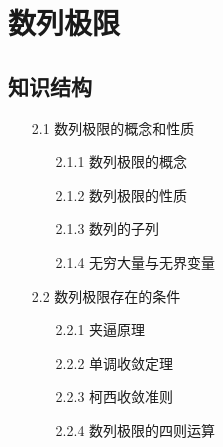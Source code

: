 \documentclass[12pt,UTF8]{ctexart}
\begin{document}
\setcounter{section}{1}
\section{数列极限}
\noindent
\subsection{知识结构}
	\begin{enumerate}
		\item[2.1] 数列极限的概念和性质
			\begin{enumerate}
				\item[2.1.1]数列极限的概念
				\item[2.1.2]数列极限的性质
					\begin{itemize}
					\end{itemize}
				\item[2.1.3]数列的子列
				\item[2.1.4]无穷大量与无界变量
			\end{enumerate}
		\item[2.2] 数列极限存在的条件
			\begin{enumerate}
				\item[2.2.1]夹逼原理
				\item[2.2.2]单调收敛定理
				\item[2.2.3]柯西收敛准则
				\item[2.2.4]数列极限的四则运算
			\end{enumerate}
\end{enumerate}
\end{document}
